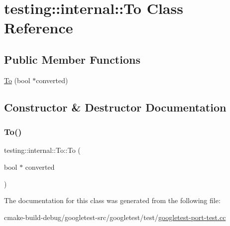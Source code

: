 \hypertarget{classtesting_1_1internal_1_1To}{}\section{testing\+::internal\+::To Class Reference}
\label{classtesting_1_1internal_1_1To}
\subsection*{Public Member Functions}
\begin{DoxyCompactItemize}
\item 
\mbox{\hyperlink{classtesting_1_1internal_1_1To_a447354e55d855ed0f1a1de8b2b54d345}{To}} (bool $\ast$converted)
\end{DoxyCompactItemize}


\subsection{Constructor \& Destructor Documentation}
\mbox{\label{classtesting_1_1internal_1_1To_a447354e55d855ed0f1a1de8b2b54d345}} 
\subsubsection{\texorpdfstring{To()}{To()}}
{\footnotesize\ttfamily testing\+::internal\+::\+To\+::\+To (\begin{DoxyParamCaption}\item[{bool $\ast$}]{converted }\end{DoxyParamCaption})\hspace{0.3cm}{\ttfamily [inline]}}



The documentation for this class was generated from the following file\+:\begin{DoxyCompactItemize}
\item 
cmake-\/build-\/debug/googletest-\/src/googletest/test/\mbox{\hyperlink{googletest-port-test_8cc}{googletest-\/port-\/test.\+cc}}\end{DoxyCompactItemize}
